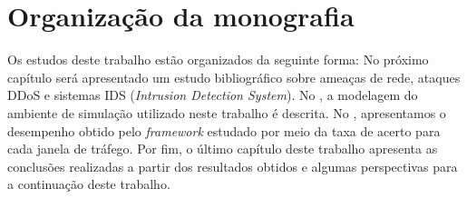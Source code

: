 \section{Organização da monografia}
Os estudos deste trabalho estão organizados da seguinte forma: No próximo capítulo será apresentado um estudo bibliográfico sobre ameaças de rede, ataques DDoS e sistemas IDS (\textit{Intrusion Detection System}). No , a modelagem do ambiente de simulação utilizado neste trabalho é descrita. No , apresentamos o desempenho obtido pelo \textit{framework} estudado por meio da taxa de acerto para cada janela de tráfego. Por fim, o último capítulo deste trabalho apresenta as conclusões realizadas a partir dos resultados obtidos e algumas perspectivas para a continuação deste trabalho. 